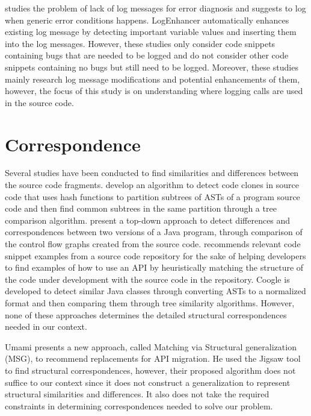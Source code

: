 \citet{yuan2012conservative} studies the problem of lack of log messages for error diagnosis and suggests to log when generic error conditions happens. LogEnhancer \cite{yuan2012improving} automatically enhances existing log message by detecting important variable values and inserting them into the log messages. However, these studies only consider code snippets containing bugs that are needed to be logged and do not consider other code snippets containing no bugs but still need to be logged. Moreover, these studies mainly research log message modifications and potential enhancements of them, however, the focus of this study is on understanding where logging calls are used in the source code.

\section{Correspondence}  \label{ch7-corr}

Several studies have been conducted to find similarities and differences between the source code fragments. \citet{baxter1998clone} develop an algorithm to detect code clones in source code that uses hash functions to partition subtrees of ASTs of a program source code and then find common subtrees in the same partition through a tree comparison algorithm. \citet{apiwattanapong2004differencing} present a top-down approach to detect differences and correspondences between two versions of a Java program, through comparison of the control flow graphs created from the source code. \citet{holmes2005strathcona} recommends relevant code snippet examples from a source code repository for the sake of helping developers to find examples of how to use an API by heuristically matching the structure of the code under development with the source code in the repository. Coogle \cite{sager2006detecting} is developed to detect similar Java classes through converting ASTs to a normalized format and then comparing them through tree similarity algorithms. However, none of these approaches determines the detailed structural correspondences needed in our context.

Umami \cite{2014:uofc:cossette} presents a new approach, called Matching via Structural generalization (MSG), to recommend replacements for API migration. He used the Jigsaw tool to find structural correspondences, however, their proposed algorithm does not suffice to our context since it does not construct a generalization to represent structural similarities and differences. It also does not take the required constraints in determining correspondences needed to solve our problem.

